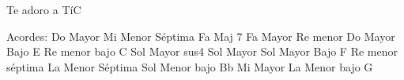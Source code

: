 \documentclass[12pt, spanish]{book}
\begin{document}
\begin{song}{Te adoro a Tí}{C}
        \ifChordBk
        \begin{SBOpGroup}
            Acordes:\break
            \upchord{\C}\qquad Do Mayor \hfill
            \upchord{\Emseven}\qquad Mi Menor S\'eptima \hfill\null\break
            \upchord{\FMaj}\qquad Fa Maj 7 \hfill
            \upchord{\F}\qquad Fa Mayor \hfill\null\break
            \upchord{\Dm}\qquad Re menor \hfill
            \upchord{\CE}\qquad Do Mayor Bajo E \hfill\null\break
            \upchord{\DmC}\qquad Re menor bajo C \hfill
            \upchord{\Gsus}\qquad Sol Mayor sus4 \hfill\null\break
            \upchord{\G}\qquad Sol Mayor \hfill
            \upchord{\GF}\qquad Sol Mayor Bajo F \hfill\null\break
            \upchord{\Dmseven}\qquad Re menor s\'eptima \hfill
            \upchord{\Amseven}\qquad La Menor S\'eptima \hfill\null\break
            \upchord{\GmBflat}\qquad Sol Menor bajo Bb \hfill
            \upchord{\Eseven}\qquad Mi Mayor \hfill\null\break
            \upchord{\AmG}\qquad La Menor bajo G \hfill\null\break
        \end{SBOpGroup}
        \fi
    \end{song}
\end{document}
